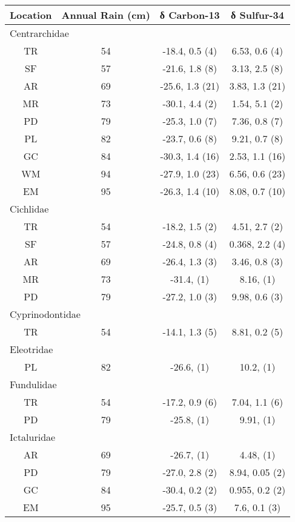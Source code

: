 \documentclass[
]{article}
\begin{document}
\begin{longtable}{cccc}
\toprule
Location & Annual Rain (cm) & δ Carbon-13 & δ Sulfur-34 \\ 
\midrule
\multicolumn{4}{l}{Centrarchidae} \\ 
\midrule
TR & 54 & -18.4, 0.5 (4) & 6.53, 0.6 (4) \\ 
SF & 57 & -21.6, 1.8 (8) & 3.13, 2.5 (8) \\ 
AR & 69 & -25.6, 1.3 (21) & 3.83, 1.3 (21) \\ 
MR & 73 & -30.1, 4.4 (2) & 1.54, 5.1 (2) \\ 
PD & 79 & -25.3, 1.0 (7) & 7.36, 0.8 (7) \\ 
PL & 82 & -23.7, 0.6 (8) & 9.21, 0.7 (8) \\ 
GC & 84 & -30.3, 1.4 (16) & 2.53, 1.1 (16) \\ 
WM & 94 & -27.9, 1.0 (23) & 6.56, 0.6 (23) \\ 
EM & 95 & -26.3, 1.4 (10) & 8.08, 0.7 (10) \\ 
\midrule
\multicolumn{4}{l}{Cichlidae} \\ 
\midrule
TR & 54 & -18.2, 1.5 (2) & 4.51, 2.7 (2) \\ 
SF & 57 & -24.8, 0.8 (4) & 0.368, 2.2 (4) \\ 
AR & 69 & -26.4, 1.3 (3) & 3.46, 0.8 (3) \\ 
MR & 73 & -31.4,     (1) & 8.16,     (1) \\ 
PD & 79 & -27.2, 1.0 (3) & 9.98, 0.6 (3) \\ 
\midrule
\multicolumn{4}{l}{Cyprinodontidae} \\ 
\midrule
TR & 54 & -14.1, 1.3 (5) & 8.81, 0.2 (5) \\ 
\midrule
\multicolumn{4}{l}{Eleotridae} \\ 
\midrule
PL & 82 & -26.6,     (1) & 10.2,     (1) \\ 
\midrule
\multicolumn{4}{l}{Fundulidae} \\ 
\midrule
TR & 54 & -17.2, 0.9 (6) & 7.04, 1.1 (6) \\ 
PD & 79 & -25.8,     (1) & 9.91,     (1) \\ 
\midrule
\multicolumn{4}{l}{Ictaluridae} \\ 
\midrule
AR & 69 & -26.7,     (1) & 4.48,     (1) \\ 
PD & 79 & -27.0, 2.8 (2) & 8.94, 0.05 (2) \\ 
GC & 84 & -30.4, 0.2 (2) & 0.955, 0.2 (2) \\ 
EM & 95 & -25.7, 0.5 (3) & 7.6, 0.1 (3) \\ 

\end{longtable}
\end{document}

